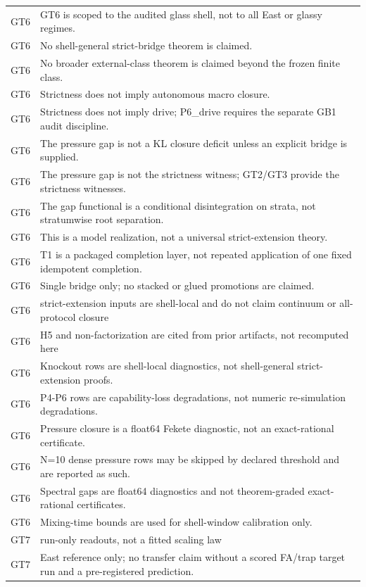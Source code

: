 \documentclass[11pt]{article}
\theoremstyle{definition}
\begin{document}
\begin{longtable}{lp{9cm}}
GT6 & GT6 is scoped to the audited glass shell, not to all East or glassy regimes. \\
GT6 & No shell-general strict-bridge theorem is claimed. \\
GT6 & No broader external-class theorem is claimed beyond the frozen finite class. \\
GT6 & Strictness does not imply autonomous macro closure. \\
GT6 & Strictness does not imply drive; P6\_drive requires the separate GB1 audit discipline. \\
GT6 & The pressure gap is not a KL closure deficit unless an explicit bridge is supplied. \\
GT6 & The pressure gap is not the strictness witness; GT2/GT3 provide the strictness witnesses. \\
GT6 & The gap functional is a conditional disintegration on strata, not stratumwise root separation. \\
GT6 & This is a model realization, not a universal strict-extension theory. \\
GT6 & T1 is a packaged completion layer, not repeated application of one fixed idempotent completion. \\
GT6 & Single bridge only; no stacked or glued promotions are claimed. \\
GT6 & strict-extension inputs are shell-local and do not claim continuum or all-protocol closure \\
GT6 & H5 and non-factorization are cited from prior artifacts, not recomputed here \\
GT6 & Knockout rows are shell-local diagnostics, not shell-general strict-extension proofs. \\
GT6 & P4-P6 rows are capability-loss degradations, not numeric re-simulation degradations. \\
GT6 & Pressure closure is a float64 Fekete diagnostic, not an exact-rational certificate. \\
GT6 & N=10 dense pressure rows may be skipped by declared threshold and are reported as such. \\
GT6 & Spectral gaps are float64 diagnostics and not theorem-graded exact-rational certificates. \\
GT6 & Mixing-time bounds are used for shell-window calibration only. \\
GT7 & run-only readouts, not a fitted scaling law \\
GT7 & East reference only; no transfer claim without a scored FA/trap target run and a pre-registered prediction. \\

\end{longtable}
\end{document}
